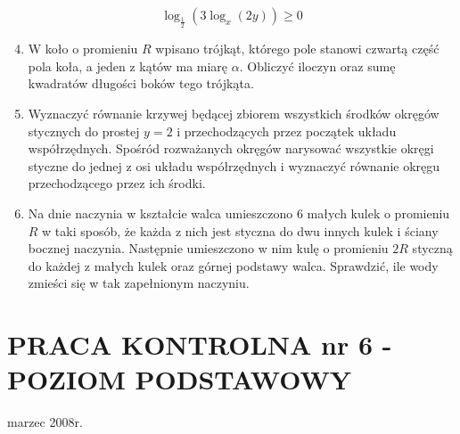 \documentclass[10pt]{article}
\begin{document}
$$
\log _{\frac{1}{2}}\left(3 \log _{x}(2 y)\right) \geqslant 0
$$

\begin{enumerate}
  \setcounter{enumi}{3}
  \item W koło o promieniu $R$ wpisano trójkąt, którego pole stanowi czwartą część pola koła, a jeden z kątów ma miarę $\alpha$. Obliczyć iloczyn oraz sumę kwadratów długości boków tego trójkąta.
  \item Wyznaczyć równanie krzywej będącej zbiorem wszystkich środków okręgów stycznych do prostej $y=2$ i przechodzących przez początek układu współrzędnych. Spośród rozważanych okręgów narysować wszystkie okręgi styczne do jednej z osi układu współrzędnych i wyznaczyć równanie okręgu przechodzącego przez ich środki.
  \item Na dnie naczynia w kształcie walca umieszczono 6 małych kulek o promieniu $R$ w taki sposób, że każda z nich jest styczna do dwu innych kulek i ściany bocznej naczynia. Następnie umieszczono w nim kulę o promieniu $2 R$ styczną do każdej z małych kulek oraz górnej podstawy walca. Sprawdzić, ile wody zmieści się w tak zapełnionym naczyniu.
\end{enumerate}

\section*{PRACA KONTROLNA nr 6 - POZIOM PODSTAWOWY}
marzec 2008r.
\end{document}
